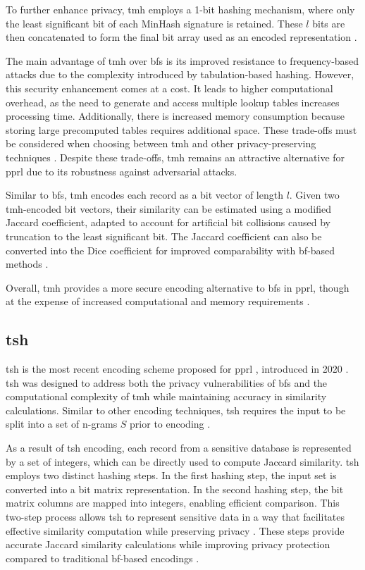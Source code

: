 To further enhance privacy, \ac{tmh} employs a 1-bit hashing mechanism, where only the least significant bit of each MinHash signature is retained.
These $l$ bits are then concatenated to form the final bit array used as an encoded representation \cite{schaefer2024}.

The main advantage of \ac{tmh} over \ac{bf}s is its improved resistance to frequency-based attacks due to the complexity introduced by tabulation-based hashing.
However, this security enhancement comes at a cost.
It leads to higher computational overhead, as the need to generate and access multiple lookup tables increases processing time.
Additionally, there is increased memory consumption because storing large precomputed tables requires additional space.
These trade-offs must be considered when choosing between \ac{tmh} and other privacy-preserving techniques \cite{schaefer2024,vidanage2020graph}.
Despite these trade-offs, \ac{tmh} remains an attractive alternative for \ac{pprl} due to its robustness against adversarial attacks.

Similar to \ac{bf}s, \ac{tmh} encodes each record as a bit vector of length $l$.
Given two \ac{tmh}-encoded bit vectors, their similarity can be estimated using a modified Jaccard coefficient, adapted to account for artificial bit collisions caused by truncation to the least significant bit.
The Jaccard coefficient can also be converted into the Dice coefficient for improved comparability with \ac{bf}-based methods \cite{vidanage2020graph,schaefer2024}.

Overall, \ac{tmh} provides a more secure encoding alternative to \ac{bf}s in \ac{pprl}, though at the expense of increased computational and memory requirements \cite{schaefer2024, vidanage2020graph}.


\subsection{\ac{tsh}} \label{sec:tsh}

\ac{tsh} is the most recent encoding scheme proposed for \ac{pprl} , introduced in 2020 \cite{vidanage2020graph}.
\ac{tsh} was designed to address both the privacy vulnerabilities of \ac{bf}s and the computational complexity of \ac{tmh} while maintaining accuracy in similarity calculations.
Similar to other encoding techniques, \ac{tsh} requires the input to be split into a set of n-grams $S$ prior to encoding \cite{schaefer2024}.

As a result of \ac{tsh} encoding, each record from a sensitive database is represented by a set of integers, which can be directly used to compute Jaccard similarity.
\ac{tsh} employs two distinct hashing steps.
In the first hashing step, the input set is converted into a bit matrix representation.
In the second hashing step, the bit matrix columns are mapped into integers, enabling efficient comparison.
This two-step process allows \ac{tsh} to represent sensitive data in a way that facilitates effective similarity computation while preserving privacy \cite{schaefer2024}.
These steps provide accurate Jaccard similarity calculations while improving privacy protection compared to traditional \ac{bf}-based encodings \cite{vidanage2020graph}.

